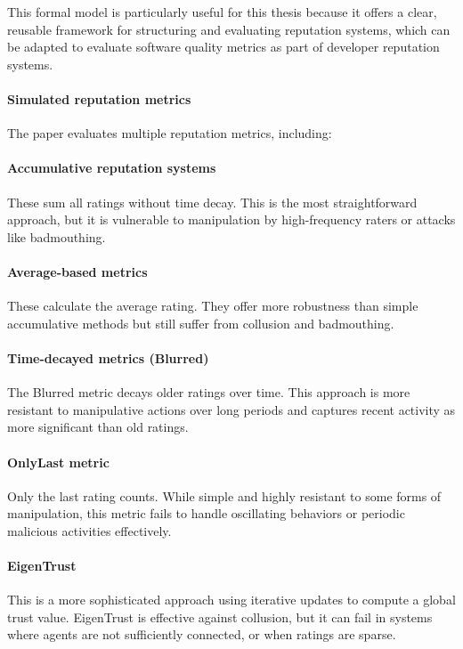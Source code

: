 \documentclass[11pt,a4paper]{article}
\begin{document}
This formal model is particularly useful for this thesis because it offers a clear, reusable framework for structuring and evaluating reputation systems, which can be adapted to evaluate software quality metrics as part of developer reputation systems.

\paragraph{Simulated reputation metrics}
The paper evaluates multiple reputation metrics, including:

\paragraph{Accumulative reputation systems}
These sum all ratings without time decay. This is the most straightforward approach, but it is vulnerable to manipulation by high-frequency raters or attacks like badmouthing.

\paragraph{Average-based metrics}
These calculate the average rating. They offer more robustness than simple accumulative methods but still suffer from collusion and badmouthing.

\paragraph{Time-decayed metrics (Blurred)}
The Blurred metric decays older ratings over time. This approach is more resistant to manipulative actions over long periods and captures recent activity as more significant than old ratings.

\paragraph{OnlyLast metric}
Only the last rating counts. While simple and highly resistant to some forms of manipulation, this metric fails to handle oscillating behaviors or periodic malicious activities effectively.

\paragraph{EigenTrust}
This is a more sophisticated approach using iterative updates to compute a global trust value. EigenTrust is effective against collusion, but it can fail in systems where agents are not sufficiently connected, or when ratings are sparse.
\end{document}
